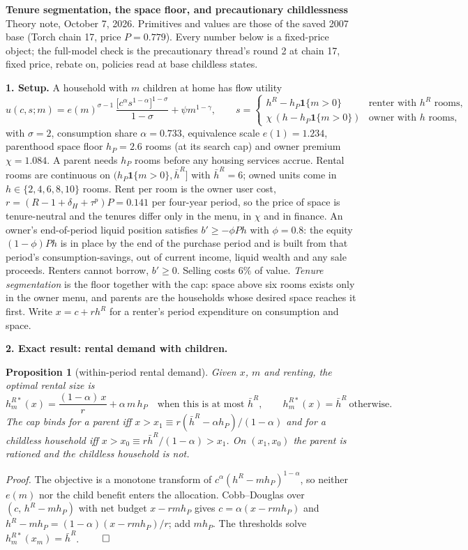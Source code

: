 \documentclass[10pt]{article}
\newtheorem{proposition}{Proposition}
\newcommand{\1}{\mathbf 1}
\newcommand{\hbR}{\bar h^{R}}
\begin{document}
{\large\bfseries Tenure segmentation, the space floor, and precautionary childlessness}\\
{\small Theory note, October 7, 2026. Primitives and values are those of the saved 2007 base (Torch chain 17, price $P=0.779$). Every number below is a fixed-price object; the full-model check is the precautionary thread's round 2 at chain 17, fixed price, rebate on, policies read at base childless states.}

\medskip
\textbf{1. Setup.}
A household with $m$ children at home has flow utility
\[
u(c,s;m)=e(m)^{\sigma-1}\,\frac{\bigl[c^{\alpha}s^{1-\alpha}\bigr]^{1-\sigma}}{1-\sigma}+\psi m^{1-\gamma},
\qquad
s=\begin{cases} h^{R}-h_P\1\{m>0\} & \text{renter with } h^{R}\text{ rooms},\\ \chi\,(h-h_P\1\{m>0\}) & \text{owner with } h \text{ rooms},\end{cases}
\]
with $\sigma=2$, consumption share $\alpha=0.733$, equivalence scale $e(1)=1.234$, parenthood space floor $h_P=2.6$ rooms (at its search cap) and owner premium $\chi=1.084$. A parent needs $h_P$ rooms before any housing services accrue. Rental rooms are continuous on $(h_P\1\{m>0\},\hbR]$ with $\hbR=6$; owned units come in $h\in\{2,4,6,8,10\}$ rooms. Rent per room is the owner user cost, $r=(R-1+\delta_H+\tau^{p})P=0.141$ per four-year period, so the price of space is tenure-neutral and the tenures differ only in the menu, in $\chi$ and in finance. An owner's end-of-period liquid position satisfies $b'\ge-\phi Ph$ with $\phi=0.8$: the equity $(1-\phi)Ph$ is in place by the end of the purchase period and is built from that period's consumption-savings, out of current income, liquid wealth and any sale proceeds. Renters cannot borrow, $b'\ge0$. Selling costs $6\%$ of value.
\emph{Tenure segmentation} is the floor together with the cap: space above six rooms exists only in the owner menu, and parents are the households whose desired space reaches it first. Write $x=c+rh^{R}$ for a renter's period expenditure on consumption and space.

\medskip
\textbf{2. Exact result: rental demand with children.}
\begin{proposition}[within-period rental demand]
Given $x$, $m$ and renting, the optimal rental size is
\[
h^{R*}_m(x)=\frac{(1-\alpha)\,x}{r}+\alpha\,m\,h_P\quad\text{when this is at most }\hbR,\qquad h^{R*}_m(x)=\hbR\ \text{otherwise.}
\]
The cap binds for a parent iff $x>x_1\equiv r(\hbR-\alpha h_P)/(1-\alpha)$ and for a childless household iff $x>x_0\equiv r\hbR/(1-\alpha)>x_1$. On $(x_1,x_0)$ the parent is rationed and the childless household is not.
\end{proposition}
\emph{Proof.} The objective is a monotone transform of $c^{\alpha}(h^{R}-mh_P)^{1-\alpha}$, so neither $e(m)$ nor the child benefit enters the allocation. Cobb--Douglas over $(c,\,h^{R}-mh_P)$ with net budget $x-rmh_P$ gives $c=\alpha(x-rmh_P)$ and $h^{R}-mh_P=(1-\alpha)(x-rmh_P)/r$; add $mh_P$. The thresholds solve $h^{R*}_m(x_m)=\hbR$. $\qed$
\end{document}
